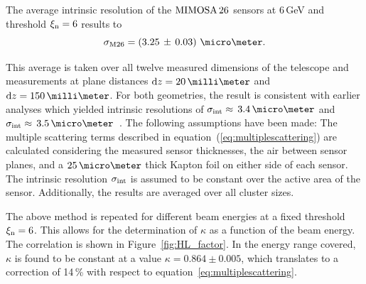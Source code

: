 The average intrinsic resolution of the $\textrm{MIMOSA\,26}$ sensors at 6\,GeV and threshold $\xi_{\textrm{n}} = 6$ results to
\begin{equation}
 \sigma_{\textrm{M26}} = \left( 3.25\,\pm\, \allowbreak 0.03 \right)\,\micro\meter.  
\end{equation}

\noindent
This average is taken over all twelve measured dimensions of the telescope and measurements at plane distances $\dz =  20\,\milli\meter$ and $\dz =  150\,\milli\meter$. 
For both geometries, the result is consistent with earlier analyses which yielded intrinsic resolutions of $\sigmai \approx\,3.4\,\micro\meter$ and $\sigmai \approx\,3.5\,\micro\meter$~\cite{ref:thomas,ref:mimosa26}.
The following assumptions have been made: 
The multiple scattering terms described in equation~(\ref{eq:multiplescattering}) are calculated considering the measured sensor thicknesses, the air between sensor planes, and a $25\,\micro\meter$
thick Kapton foil on either side of each sensor.
The intrinsic resolution $\sigma_{\textrm{int}}$ is assumed to be constant over the active area of the sensor. 
Additionally, the results are averaged over all cluster sizes. 


The above method is repeated for different beam energies at a fixed threshold $\xi_{\textrm{n}} = 6$. 
This allows for the determination of $\kappa$ as a function of the beam energy. 
The correlation is shown in Figure~\ref{fig:HL_factor}. 
In the energy range covered, $\kappa$ is found to be constant at a value $\kappa = 0.864 \pm 0.005$, which translates to a correction of 14\,\% with respect to equation~\ref{eq:multiplescattering}.


